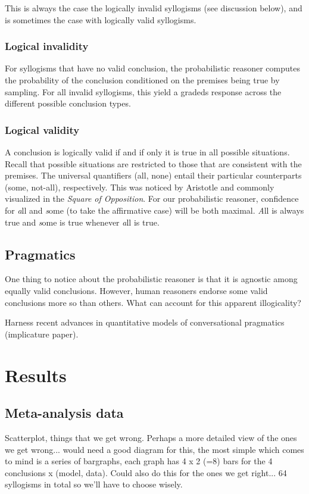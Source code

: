 \documentclass[10pt,letterpaper]{article}
\begin{document}
This is always the case the logically invalid syllogisms (see discussion below), and is sometimes the case with logically valid syllogisms.

\subsubsection{Logical invalidity}
For syllogisms that have no valid conclusion, the probabilistic reasoner computes the probability of the conclusion conditioned on the premises being true by sampling. For all invalid syllogisms, this yield a gradeds response across the different possible conclusion types. 


\subsubsection{Logical validity}
A conclusion is logically valid if and if only it is true in all possible situations. Recall that possible situations are restricted to those that are consistent with the premises. The universal quantifiers (all, none) entail their particular counterparts (some, not-all), respectively. This was noticed by Aristotle and commonly visualized in the \emph{Square of Opposition}. For our probabilistic reasoner, confidence for {\emph all} and {\emph some} (to take the affirmative case) will be both maximal. {\emph All} is always true and {\emph some} is true whenever {\emph all} is true.


\subsection{Pragmatics}

One thing to notice about the probabilistic reasoner is that it is agnostic among equally valid conclusions. However, human reasoners endorse some valid conclusions more so than others. What can account for this apparent illogicality?  



Harness recent advances in quantitative models of conversational pragmatics (implicature paper). 

\section{Results}

\subsection{Meta-analysis data}
Scatterplot, things that we get wrong. Perhaps a more detailed view of the ones we get wrong... would need a good diagram for this, the most simple which comes to mind is a series of bargraphs, each graph has 4 x 2 (=8) bars for the 4 conclusions x (model, data). Could also do this for the ones we get right... 64 syllogisms in total so we'll have to choose wisely.
\end{document}
